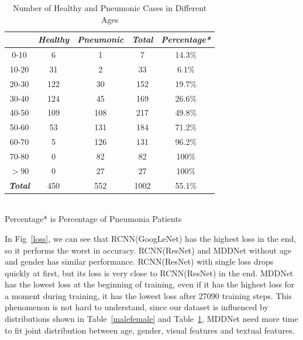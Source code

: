 \begin{table}[htb]
    \vspace{-0cm}
    \caption{Number of Healthy and Pneumonic Cases in Different Ages}
    \vspace{-0cm}
    \begin{center}
    \begin{tabular}{|c|c|c|c|c|}
        \hline
        \textbf{\textit{}} & \textbf{\textit{Healthy}} & \textbf{\textit{Pneumonic}}& \textbf{\textit{Total}}& \textbf{\textit{Percentage*}} \\
    \hline
    0-10 & 6 & 1 & 7 & 14.3\%\\
    10-20 & 31 & 2 & 33 & 6.1\%\\
    20-30 & 122 & 30 & 152 & 19.7\%\\
    30-40 & 124 & 45 & 169 &26.6\%\\
    40-50 & 109 & 108 & 217 &49.8\%\\
    50-60 & 53 & 131 & 184 &71.2\%\\
    60-70 & 5 & 126 & 131 &96.2\%\\
    70-80 & 0 & 82 & 82 &100\%\\
    $>90$& 0 & 27 & 27 &100\%\\
    \hline 
    \textbf{\textit{Total}} & 450 & 552 & 1002 & 55.1\% \\
    
    \hline
    \end{tabular}
    \vspace{0.1cm}
    \label{differentages}\\
    \footnotesize{Percentage* is Percentage of Pneumonia Patients}

    \end{center}
    \vspace{-0.0cm}
    \end{table}


In Fig~\ref{loss}, we can see that RCNN(GoogLeNet) has the highest loss in the end, so it performs the worst in accuracy. RCNN(ResNet) and MDDNet without age and gender has similar performance. RCNN(ResNet) with single loss drops quickly at first, but its loss is very close to RCNN(ResNet) in the end. MDDNet has the lowest loss at the beginning of training, even if it has the highest loss for a moment during training, it has the lowest loss after 27090 training steps. This phenomenon is not hard to understand, since our dataset is influenced by distributions shown in Table~\ref{malefemale} and Table~\ref{differentages}, MDDNet need more time to fit joint distribution between age, gender, visual features and textual features.



